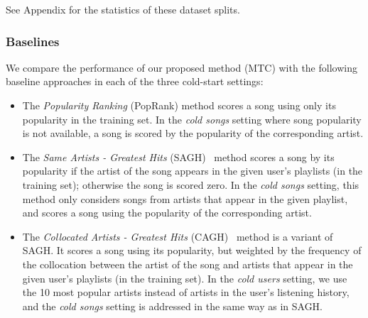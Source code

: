 See Appendix for the statistics of these dataset splits.


%



\subsubsection{Baselines}
We compare the performance of our proposed method (\ie MTC) %
with the following %
baseline approaches in each of the three cold-start settings:
\begin{itemize}
\item The {\it Popularity Ranking} (PopRank) method scores a song using only its popularity in the training set.
      In the \emph{cold songs} setting where song popularity is not available, 
      a song is scored by the popularity of the corresponding artist.
\item The {\it Same Artists - Greatest Hits} (SAGH)~\cite{mcfee2012million} method scores a song
      by its popularity if the artist of the song appears in the given user's playlists (in the training set);
      otherwise the song is scored zero.
      In the {\it cold songs} setting, this method only considers songs from artists that appear in the given playlist,
      and scores a song using the popularity of the corresponding artist.
\item The {\it Collocated Artists - Greatest Hits} (CAGH)~\cite{bonnin2013evaluating} method is a variant of SAGH.
      It scores a song using its popularity, but weighted by the frequency of the collocation between the artist of the song
      and artists that appear in the given user's playlists (in the training set).
      In the \emph{cold users} setting, we use the 10 most popular artists instead of artists 
      in the user's listening history, and the \emph{cold songs} setting is addressed in the same way as in SAGH.

\end{itemize}
